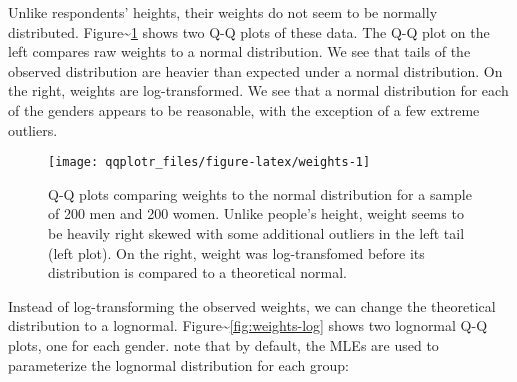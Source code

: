 Unlike respondents' heights, their weights do not seem to be normally
distributed. Figure\textasciitilde{}\ref{fig:weights} shows two Q-Q
plots of these data. The Q-Q plot on the left compares raw weights to a
normal distribution. We see that tails of the observed distribution are
heavier than expected under a normal distribution. On the right, weights
are log-transformed. We see that a normal distribution for each of the
genders appears to be reasonable, with the exception of a few extreme
outliers.

\begin{Schunk}
\begin{figure}

{\centering \texttt{[image: qqplotr\_files/figure-latex/weights-1]} 

}

\caption[Q-Q plots comparing weights to the normal distribution for a sample of 200 men and 200 women]{Q-Q plots comparing weights to the normal distribution for a sample of 200 men and 200 women. Unlike people's height, weight seems to be heavily right skewed with some additional outliers in the left tail (left plot). On the right, weight was log-transfomed before its distribution is compared to a theoretical normal.}\label{fig:weights}
\end{figure}
\end{Schunk}

Instead of log-transforming the observed weights, we can change the
theoretical distribution to a lognormal.
Figure\textasciitilde{}\ref{fig:weights-log} shows two lognormal Q-Q
plots, one for each gender. note that by default, the MLEs are used to
parameterize the lognormal distribution for each group:

